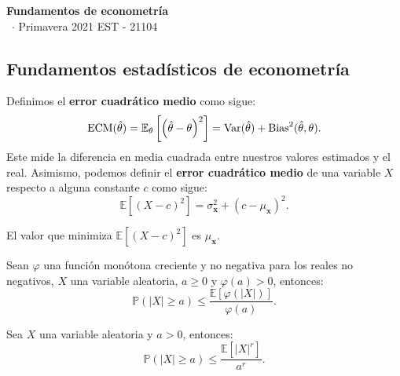 \documentclass[8pt,a4paper]{extarticle}
\renewcommand{\csClass}{Fundamentos de econometría}
\renewcommand{\csClassCode}{EST - 21104}
\renewcommand{\csTerm}{Primavera 2021}
\begin{document}
\begin{titlepage}
	\begin{center}
		\vspace*{1cm}
		\Huge
		\textbf{\csClass}
		\vspace{0.5cm} \\
		\Large
		\cs\ $\cdot$ \csTerm
		\vfill
		\csAuthorName
		\vspace{0.8cm}
		\csClassCode\\
		\csSchool
	\end{center}
\end{titlepage}

\begin{multicols}{3}
	\setcounter{page}{1}

	\section{Fundamentos estadísticos de econometría}

	\begin{boxdef}
		Definimos el \textbf{error cuadrático medio} como sigue:
		\[
			\text{\normalfont ECM} (\hat{\theta}) = \mathbb{E}_{\theta} \left[ \left( \hat{\theta} - \theta \right)^2  \right]  = \text{\normalfont Var} (\hat{\theta}) + \text{\normalfont Bias}^{2} (\hat{\theta}, \theta)
			.\]
		Este mide la diferencia en media cuadrada entre nuestros valores estimados y el real. Asimismo, podemos definir el \textbf{error cuadrático medio} de una variable $X$ respecto a alguna constante $c$ como sigue:
		\[
			\mathbb{E} \left[ (X - c)^2 \right] = \sigma^2_{\mathbf{x}} + (c - \mu_\mathbf{x})^2
			.\]
	\end{boxdef}

	\begin{boxtheo}
		El valor que minimiza $\mathbb{E}\left[(X-c)^2\right]$ es $\mu_{\mathbf{x}}$.
	\end{boxtheo}

	\begin{boxcor}
		Sean $\varphi$ una función monótona creciente y no negativa para los reales no negativos, $X$ una variable aleatoria, $a \ge 0$ y $\varphi(a) > 0$, entonces:
		\[
			\mathbb{P}\left( \left| X \right| \ge a \right) \le \frac{\mathbb{E}\left[ \varphi \left( \left| X \right|  \right)  \right] }{\varphi(a)}
			.\]
	\end{boxcor}

	\begin{boxcor}
		Sea $X$ una variable aleatoria y $a > 0$, entonces:
		\[
			\mathbb{P}\left( \left| X \right| \ge a  \right) \le \frac{\mathbb{E}\left[ \left| X \right|^r  \right] }{a^r}
			.\]
	\end{boxcor}


\end{multicols}
\end{document}
